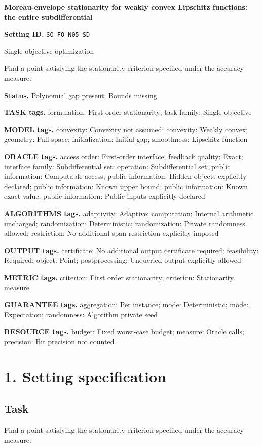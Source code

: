 \documentclass[10pt,a4paper]{article}
\begin{document}
\raggedright

{\LARGE\bfseries\sffamily\color{AtlasNavy} Moreau-envelope stationarity for weakly convex Lipschitz functions: the entire subdifferential\par}\vspace{5pt}
\textbf{Setting ID.} \texttt{SO\_\allowbreak{}FO\_\allowbreak{}N05\_\allowbreak{}SD}

Single-objective optimization

Find a point satisfying the stationarity criterion specified under the accuracy measure.

\textbf{Status.} Polynomial gap present; Bounds missing

\textbf{TASK tags.} formulation: First order stationarity; task family: Single objective

\textbf{MODEL tags.} convexity: Convexity not assumed; convexity: Weakly convex; geometry: Full space; initialization: Initial gap; smoothness: Lipschitz function

\textbf{ORACLE tags.} access order: First-order interface; feedback quality: Exact; interface family: Subdifferential set; operation: Subdifferential set; public information: Computable access; public information: Hidden objects explicitly declared; public information: Known upper bound; public information: Known exact value; public information: Public inputs explicitly declared

\textbf{ALGORITHMS tags.} adaptivity: Adaptive; computation: Internal arithmetic uncharged; randomization: Deterministic; randomization: Private randomness allowed; restriction: No additional span restriction explicitly imposed

\textbf{OUTPUT tags.} certificate: No additional output certificate required; feasibility: Required; object: Point; postprocessing: Unqueried output explicitly allowed

\textbf{METRIC tags.} criterion: First order stationarity; criterion: Stationarity measure

\textbf{GUARANTEE tags.} aggregation: Per instance; mode: Deterministic; mode: Expectation; randomness: Algorithm private seed

\textbf{RESOURCE tags.} budget: Fixed worst-case budget; measure: Oracle calls; precision: Bit precision not counted

\section{1. Setting specification}
\subsection{Task}
Find a point satisfying the stationarity criterion specified under the accuracy measure.
\end{document}
